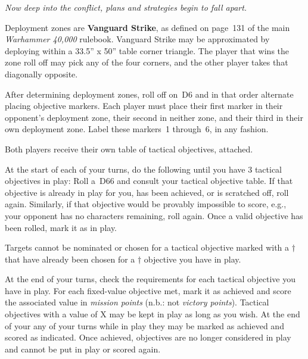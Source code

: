 \clearpage
{}

\centerline{\emph{Now deep into the conflict, plans and strategies
    begin to fall apart.}}


Deployment zones are \textbf{Vanguard Strike}, as defined on page~131
of the main \emph{Warhammer 40,000} rulebook.  Vanguard Strike may be
approximated by deploying within a 33.5'' x 50'' table corner
triangle.  The player that wins the zone roll off may pick any of the
four corners, and the other player takes that diagonally opposite.

\bigskip%
After determining deployment zones, roll off on~D6 and in that order
alternate placing objective markers.  Each player must place their
first marker in their opponent's deployment zone, their second in
neither zone, and their third in their own deployment zone.  Label
these markers~1 through~6, in any fashion.

\bigskip%
Both players receive their own table of tactical objectives, attached.



At the start of each of your turns, do the following until you have 3
tactical objectives in play: Roll a~D66 and consult your tactical
objective table.  If that objective is already in play for you, has
been achieved, or is scratched off, roll again.  Similarly, if that
objective would be provably impossible to score, e.g., your opponent
has no characters remaining, roll again.  Once a valid objective has
been rolled, mark it as in play.

Targets cannot be nominated or chosen for a tactical objective marked
with a $\dagger$ that have already been chosen for a $\dagger$
objective you have in play.

\smallskip
At the end of your turns, check the requirements for each tactical
objective you have in play.  For each fixed-value objective met, mark
it as achieved and score the associated value in \emph{mission
  points} (n.b.: not \emph{victory points}).  Tactical objectives with
a value of X may be kept in play as long as you wish.  At the end of
your any of your turns while in play they may be marked as achieved
and scored as indicated.  Once achieved, objectives are no longer
considered in play and cannot be put in play or scored again.

